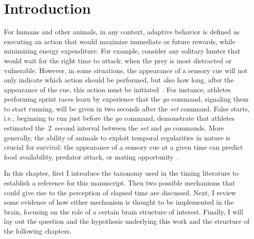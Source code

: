 \chapter{Introduction}
\label{ch:intro:intro}

For humans and other animals, in any context, adaptive behavior is defined as executing an action that would maximize immediate or future rewards, while minimizing energy expenditure.
For example, consider any solitary hunter that would wait for the right time to attack:
    when the prey is most distracted or vulnerable.
However, in some situations, the appearance of a sensory cue will not only indicate which action should be performed, but also how long, after the appearance of the cue, this action must be initiated~\cite{Balsam2009Map, Nobre2018NatRevNeurosci}.
For instance, athletes performing sprint races learn by experience that the \textit{go} command, signaling them to start running, will be given in two seconds after the \textit{set} command.
False starts, i.e., beginning to run just before the \textit{go} command, demonstrate that athletes estimated the~2~second interval between the \textit{set} and \textit{go} commands.
More generally, the ability of animals to exploit temporal regularities in nature is crucial for survival:
    the appearance of a sensory cue at a given time can predict food availability, predator attack, or mating opportunity~\cite{Kacelnik2002,Gallistel1990book}.
\par
In this chapter, first I introduce the taxonomy used in the timing literature to establish a reference for this manuscript.
Then two possible mechanisms that could give rise to the perception of elapsed time are discussed.
Next, I review some evidence of how either mechanism is thought to be implemented in the brain, focusing on the role of a certain brain structure of interest.
Finally, I will lay out the question and the hypothesis underlying this work and the structure of the following chapters.






